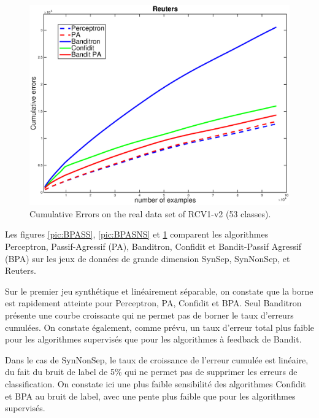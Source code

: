 \documentclass[preprint,12pt,authoryear]{elsarticle}
\begin{document}
\begin{figure}[ht!]
	\centerline{
		\includegraphics[width=\linewidth]{figs/RCV1_v2_53class.eps}}
	\caption{Cumulative Errors  on the real data set of RCV1-v2 (53 classes).}
	\label{pic:BPARCV}
\end{figure}

Les figures \ref{pic:BPASS}, \ref{pic:BPASNS} et \ref{pic:BPARCV} comparent les algorithmes Perceptron, Passif-Agressif (PA), Banditron, Confidit et Bandit-Passif Agressif (BPA) sur les jeux de données de grande dimension SynSep, SynNonSep, et Reuters. 

Sur le premier jeu synthétique et linéairement séparable, on constate que la borne est rapidement atteinte pour Perceptron, PA, Confidit et BPA. Seul Banditron présente une courbe croissante qui ne permet pas de borner le taux d'erreurs cumulées.  On constate également, comme prévu, un taux d'erreur total plus faible pour les algorithmes supervisés que pour les algorithmes à feedback de Bandit.

Dans le cas de SynNonSep, le taux de croissance de l'erreur cumulée est linéaire, du fait du bruit de label de 5\% qui ne permet pas de supprimer les erreurs de classification. On constate ici une plus faible sensibilité des algorithmes Confidit et BPA au bruit de label, avec une pente plus faible que pour les algorithmes supervisés.

\end{document}
